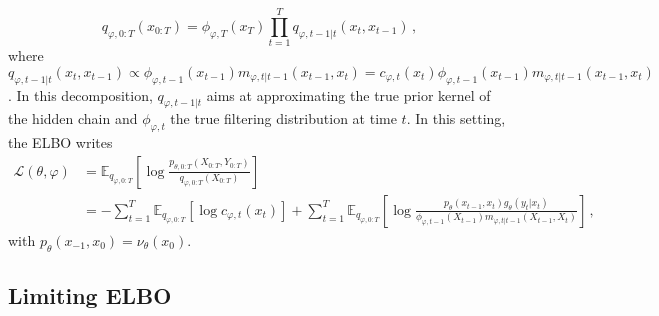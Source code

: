 \documentclass{article}
\newcommand{\1}{\mathbbm{1}}
\begin{document}
\begin{itemize}
$$
q_{\varphi,0:T}(x_{0:T}) = \phi_{\varphi,T}(x_T)\prod_{t=1}^Tq_{\varphi,t-1|t}(x_t,x_{t-1})\,,
$$
where $q_{\varphi,t-1|t}(x_t,x_{t-1}) \propto \phi_{\varphi,t-1}(x_{t-1})m_{\varphi,t|t-1}(x_{t-1},x_t) = c_{\varphi,t}(x_t)\phi_{\varphi,t-1}(x_{t-1})m_{\varphi,t|t-1}(x_{t-1},x_t)$. In this decomposition, $q_{\varphi,t-1|t}$ aims at approximating the true prior kernel of the hidden chain and $\phi_{\varphi,t}$ the true filtering distribution at time $t$. In this setting, the ELBO writes
\begin{align*}
\mathcal{L}(\theta,\varphi) &= \mathbb{E}_{q_{\varphi,0:T}}\left[\log \frac{p_{\theta,0:T}(X_{0:T},Y_{0:T})}{q_{\varphi,0:T}(X_{0:T})}\right]\\
&= -\sum_{t=1}^T\mathbb{E}_{q_{\varphi,0:T}}\left[\log c_{\varphi,t}(x_t)\right] + \sum_{t=1}^T\mathbb{E}_{q_{\varphi,0:T}}\left[\log \frac{p_\theta(x_{t-1},x_t)g_\theta(y_t|x_t)}{ \phi_{\varphi,t-1}(X_{t-1})m_{\varphi,t|t-1}(X_{t-1},X_t) }\right]\,,
\end{align*}
with $p_\theta(x_{-1},x_0) = \nu_\theta(x_0)$.
\end{itemize}

\clearpage
\newpage

\subsection*{Limiting ELBO}
\end{document}
